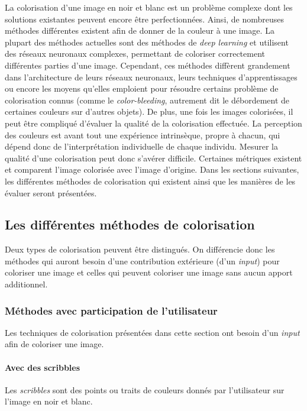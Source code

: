 \documentclass{article}
\begin{document}
La colorisation d'une image en noir et blanc est un problème complexe dont les solutions existantes
peuvent encore être perfectionnées.
Ainsi, de nombreuses méthodes différentes existent afin de donner de la couleur à une image.
La plupart des méthodes actuelles sont des méthodes de \textit{deep learning} et utilisent des réseaux neuronaux complexes,
permettant de coloriser correctement différentes parties d'une image. Cependant, ces méthodes diffèrent grandement
dans l'architecture de leurs réseaux neuronaux, leurs techniques d'apprentissages ou encore les moyens qu'elles emploient pour résoudre
certains problème de colorisation connus (comme le \textit{color-bleeding}, autrement dit le débordement de certaines couleurs sur d'autres objets). 
De plus, une fois les images colorisées, il peut être compliqué d'évaluer la qualité de la colorisation effectuée. La perception des couleurs est avant
tout une expérience intrinsèque, propre à chacun, qui dépend donc de l'interprétation individuelle de chaque individu.
Mesurer la qualité d'une colorisation peut donc s'avérer difficile. Certaines métriques existent et comparent l'image colorisée avec l'image d'origine.
Dans les sections suivantes, les différentes méthodes de colorisation qui existent ainsi que les manières de les évaluer seront 
présentées.

\subsection{Les différentes méthodes de colorisation}

Deux types de colorisation peuvent être distingués. On différencie donc les méthodes qui auront besoin 
d'une contribution extérieure (d'un \textit{input}) pour coloriser une image et celles qui peuvent coloriser
une image sans aucun apport additionnel. 

\subsubsection{Méthodes avec participation de l'utilisateur}

Les techniques de colorisation présentées dans cette section ont besoin d'un \textit{input} 
afin de coloriser une image. 

\paragraph{Avec des scribbles}
Les \emph{scribbles} sont des points ou traits de couleurs donnés par l'utilisateur sur l'image en noir et blanc.
\end{document}

